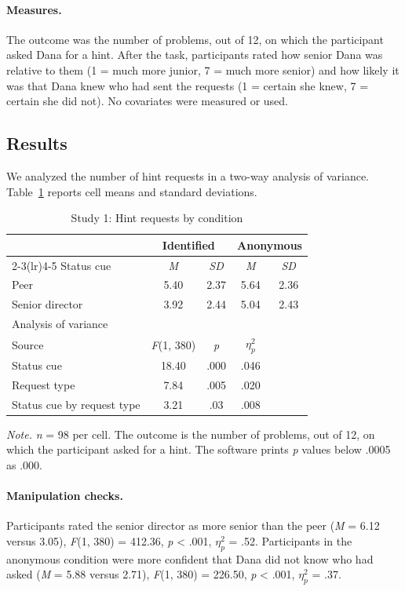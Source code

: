 \documentclass[11pt]{article}
\newcommand{\etap}{\ensuremath{\eta^2_p}}
\begin{document}
\paragraph{Measures.} The outcome was the number of problems, out of 12, on which the participant asked Dana for a hint. After the task, participants rated how senior Dana was relative to them (1 = much more junior, 7 = much more senior) and how likely it was that Dana knew who had sent the requests (1 = certain she knew, 7 = certain she did not). No covariates were measured or used.

\subsection{Results}

We analyzed the number of hint requests in a two-way analysis of variance. Table~\ref{tab:s1} reports cell means and standard deviations.

\begin{table}[ht]
\centering
\caption{Study 1: Hint requests by condition}
\label{tab:s1}
\small
\begin{tabular}{lcccc}
\toprule
 & \multicolumn{2}{c}{Identified} & \multicolumn{2}{c}{Anonymous} \\
\cmidrule(lr){2-3}\cmidrule(lr){4-5}
Status cue & \textit{M} & \textit{SD} & \textit{M} & \textit{SD} \\
\midrule
Peer & 5.40 & 2.37 & 5.64 & 2.36 \\
Senior director & 3.92 & 2.44 & 5.04 & 2.43 \\
\midrule
\multicolumn{5}{l}{Analysis of variance} \\
\midrule
Source & {\itshape F}(1, 380) & \textit{p} & \etap & \\
\midrule
Status cue & 18.40 & .000 & .046 & \\
Request type & 7.84 & .005 & .020 & \\
Status cue by request type & 3.21 & .03 & .008 & \\
\bottomrule
\end{tabular}

\smallskip
\parbox{0.8\linewidth}{\footnotesize\textit{Note.} \textit{n} = 98 per cell. The outcome is the number of problems, out of 12, on which the participant asked for a hint. The software prints \textit{p} values below .0005 as .000.}
\end{table}

\paragraph{Manipulation checks.} Participants rated the senior director as more senior than the peer (\textit{M} = 6.12 versus 3.05), {\itshape F}(1, 380) = 412.36, \textit{p} < .001, \etap{} = .52. Participants in the anonymous condition were more confident that Dana did not know who had asked (\textit{M} = 5.88 versus 2.71), {\itshape F}(1, 380) = 226.50, \textit{p} < .001, \etap{} = .37.
\end{document}
